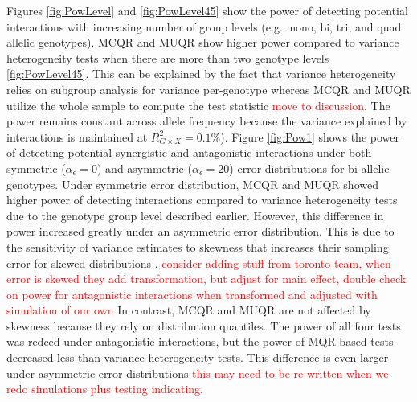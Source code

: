 \documentclass[12pt]{article}
\begin{document}
Figures \ref{fig:PowLevel} and \ref{fig:PowLevel45} show the power of detecting potential interactions with increasing number of group levels (e.g. mono, bi, tri, and quad allelic genotypes). MCQR and MUQR show higher power compared to variance heterogeneity tests when there are more than two genotype levels \ref{fig:PowLevel45}. This can be explained by the fact that variance heterogeneity relies on subgroup analysis for variance per-genotype whereas MCQR and MUQR utilize the whole sample to compute the test statistic \textcolor{red}{move to discussion}. The power remains constant across allele frequency because the variance explained by interactions is maintained at $R^{2}_{G \times X}=0.1\%$). Figure \ref{fig:Pow1} shows the power of detecting potential synergistic and antagonistic interactions under both symmetric ($\alpha_\epsilon = 0$) and asymmetric ($\alpha_\epsilon = 20$) error distributions for bi-allelic genotypes. Under symmetric error distribution, MCQR and MUQR showed higher power of detecting interactions compared to variance heterogeneity tests due to the genotype group level described earlier. However, this difference in power increased greatly under an asymmetric error distribution. This is due to the sensitivity of variance estimates to skewness that increases their sampling error for skewed distributions \cite{lee1998testing}. \textcolor{red}{consider adding stuff from toronto team, when error is skewed they add transformation, but adjust for main effect, double check on power for antagonistic interactions when transformed and adjusted with simulation of our own} In contrast, MCQR and MUQR are not affected by skewness because they rely on distribution quantiles. The power of all four tests was redced under antagonistic interactions, but the power of MQR based tests decreased less than variance heterogeneity tests. This difference is even larger under asymmetric error distributions \textcolor{red}{this may need to be re-written when we redo simulations plus testing indicating}. 
\end{document}
